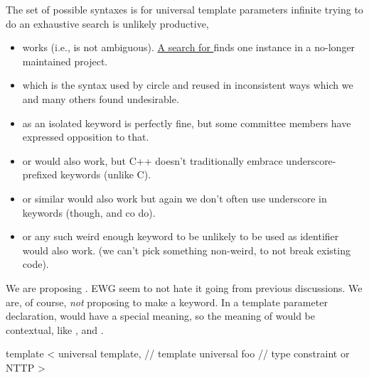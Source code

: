 \documentclass{wg21}
\begin{document}
The set of possible syntaxes is for universal template parameters infinite trying to do an exhaustive search is unlikely productive,

\begin{itemize}

\item {} works (i.e., is not ambiguous). \href{https://tinyurl.com/pth8v9p7}{A search for }
finds one instance in a no-longer maintained project.

\item {} which is the syntax used by circle and  reused  in inconsistent ways
which we and many others found undesirable.

\item {} as an isolated keyword is perfectly fine, but some committee members have expressed opposition to that.

\item {} or  would also work, but C++ doesn't traditionally embrace underscore-prefixed keywords (unlike C).

\item {} or similar would also work but again we don't often use underscore in keywords (though,  and co do).

\item {} or any such weird enough keyword to be unlikely to be used as identifier would also work. (we can't pick something non-weird, to not break existing code).

\end{itemize}

We are proposing . EWG seem to not hate it going from previous discussions.
We are, of course, \emph{not} proposing to make  a keyword.
In a template parameter declaration,  would have a special meaning, so the meaning of  would be
contextual, like ,  and .


\begin{colorblock}
template <
        universal template, // template
        universal foo       // type constraint or NTTP
>
\end{colorblock}
\end{document}
